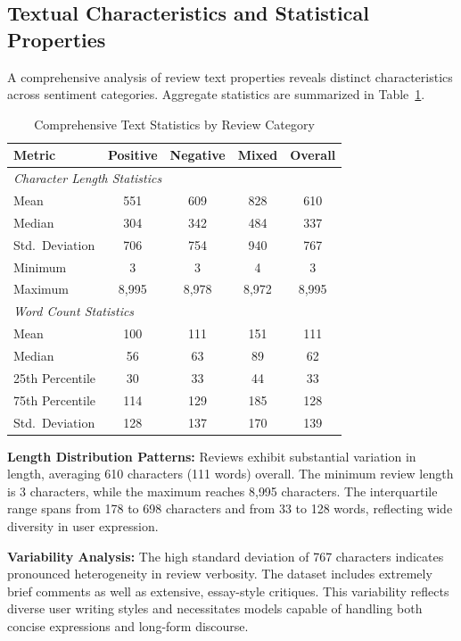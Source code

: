 \subsection{Textual Characteristics and Statistical Properties}

A comprehensive analysis of review text properties reveals distinct characteristics across sentiment categories. Aggregate statistics are summarized in Table~\ref{tab:text_stats}.

\begin{table}[htbp]
\centering
\caption{Comprehensive Text Statistics by Review Category}
\label{tab:text_stats}
\begin{tabular}{lcccc}
\toprule
\textbf{Metric} & \textbf{Positive} & \textbf{Negative} & \textbf{Mixed} & \textbf{Overall} \\
\midrule
\multicolumn{5}{l}{\textit{Character Length Statistics}} \\
Mean             & 551  & 609  & 828  & 610 \\
Median           & 304  & 342  & 484  & 337 \\
Std.\ Deviation  & 706  & 754  & 940  & 767 \\
Minimum          & 3    & 3    & 4    & 3   \\
Maximum          & 8{,}995 & 8{,}978 & 8{,}972 & 8{,}995 \\
\midrule
\multicolumn{5}{l}{\textit{Word Count Statistics}} \\
Mean             & 100  & 111  & 151  & 111 \\
Median           & 56   & 63   & 89   & 62  \\
25th Percentile  & 30   & 33   & 44   & 33  \\
75th Percentile  & 114  & 129  & 185  & 128 \\
Std.\ Deviation  & 128  & 137  & 170  & 139 \\
\bottomrule
\end{tabular}
\end{table}


\textbf{Length Distribution Patterns:}  
Reviews exhibit substantial variation in length, averaging 610 characters (111 words) overall. The minimum review length is 3 characters, while the maximum reaches 8{,}995 characters. The interquartile range spans from 178 to 698 characters and from 33 to 128 words, reflecting wide diversity in user expression.

\textbf{Variability Analysis:}  
The high standard deviation of 767 characters indicates pronounced heterogeneity in review verbosity. The dataset includes extremely brief comments as well as extensive, essay-style critiques. This variability reflects diverse user writing styles and necessitates models capable of handling both concise expressions and long-form discourse.

